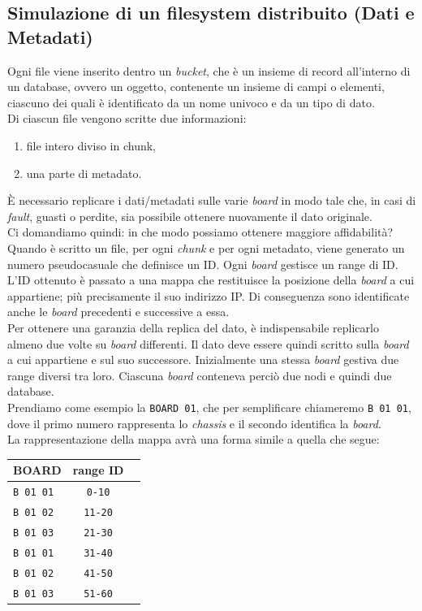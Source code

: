 \subsection{Simulazione di un filesystem distribuito (Dati e Metadati)}
Ogni file viene inserito dentro un \textit{bucket}, che \`{e} un insieme di record all'interno di un database, ovvero un oggetto, contenente un insieme di campi o elementi, ciascuno dei quali \`{e} identificato da un nome univoco e da un tipo di dato.\\
Di ciascun file vengono scritte due informazioni:
\begin{enumerate}
\item 
file intero diviso in chunk,
\item
una parte di metadato.\\
\end{enumerate}
\`{E} necessario replicare i dati/metadati sulle varie \textit{board} in modo tale che, in casi di \textit{fault}, guasti o perdite, sia possibile ottenere nuovamente il dato originale.\\
Ci domandiamo quindi: in che modo possiamo ottenere maggiore affidabilit\`{a}?
Quando \`{e} scritto un file, per ogni \textit{chunk} e per ogni metadato, viene generato un numero pseudocasuale che definisce un ID. 
Ogni \textit{board} gestisce un range di ID.
L'ID ottenuto \`{e} passato a una mappa che restituisce la posizione della \textit{board} a cui appartiene; pi\`{u} precisamente il suo indirizzo IP. Di conseguenza sono identificate anche le \textit{board} precedenti e successive a essa.\\
Per ottenere una garanzia della replica del dato, \`{e} indispensabile replicarlo almeno due volte su \textit{board} differenti. Il dato deve essere quindi scritto sulla \textit{board} a cui appartiene e sul suo successore.
Inizialmente una stessa \textit{board} gestiva due range diversi tra loro. Ciascuna \textit{board} conteneva perci\`{o} due nodi e quindi due database.\\
Prendiamo come esempio la \verb"BOARD 01", che per semplificare chiameremo \verb"B 01 01", dove il primo numero rappresenta lo \textit{chassis} e il secondo identifica la \textit{board}.\\
La rappresentazione della mappa avr\`{a} una forma simile a quella che segue:\\
\begin{center}
\begin{tabular}{ | l | c | r}
\hline
\textbf{BOARD} & \textbf{range ID}\\
\hline
\verb"B 01 01" & \verb"0-10"\\
\verb"B 01 02" & \verb"11-20"\\
\verb"B 01 03" & \verb"21-30"\\
\verb"B 01 01" & \verb"31-40"\\
\verb"B 01 02" & \verb"41-50"\\
\verb"B 01 03" & \verb"51-60"\\
\hline
\end{tabular}
\end{center}
